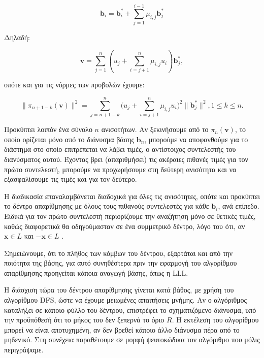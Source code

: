 $$ \bm b_i = \bm b_i^* + \sum_{j=1}^{i-1} μ_{i,j} \bm b_j^* $$

Δηλαδή:

$$ \bm v = \sum_{j=1}^n(u_j + \sum_{i=j+1}^n μ_{i,j} u_i) \bm b_j^*, $$

οπότε και για τις νόρμες των προβολών έχουμε:

\begin{equation}
    \| \pi_{n+1-k}(\bm v) \|^2 = \sum_{j=n+1-k}^n  \bigg( u_j + \sum_{i=j+1}^n μ_{i,j} u_i  \bigg) ^2 \| \bm b_j^* \|^2, 1 \leq k \leq n. 
\end{equation}

Προκύπτει λοιπόν ένα σύνολο $ n $ ανισοτήτων. Αν ξεκινήσουμε από το $ \pi_n( \bm v)$, το οποίο ορίζεται μόνο από το διάνυσμα βάσης $\bm b_n $, μπορούμε να αποφανθούμε για το διάστημα στο οποίο επιτρέπεται να λάβει τιμές, ο αντίστοιχος συντελεστής του διανύσματος αυτού. Έχοντας βρει (απαριθμήσει) τις ακέραιες πιθανές τιμές για τον πρώτο συντελεστή, μπορούμε να προχωρήσουμε στη δεύτερη ανισότητα και να εξασφαλίσουμε τις τιμές και για τον δεύτερο.

Η διαδικασία επαναλαμβάνεται διαδοχικά για όλες τις ανισότητες, οπότε και προκύπτει το δέντρο απαρίθμησης με όλους τους πιθανούς συντελεστές για κάθε $\bm b_i $, ανά επίπεδο. Ειδικά για τον πρώτο συντελεστή περιορίζουμε την αναζήτηση μόνο σε θετικές τιμές, καθώς διαφορετικά θα οδηγούμασταν σε ένα συμμετρικό δέντρο, λόγο του ότι, αν $ \bm x \in L $ και $ - \bm x \in L $ .

Σημειώνουμε, ότι το πλήθος των κόμβων του δέντρου, εξαρτάται και από την ποιότητα της βάσης, για αυτό συνηθέστερα πριν την εφαρμογή του αλγορίθμου απαρίθμησης προηγείται κάποια αναγωγή βάσης, όπως η LLL.  

Η διάσχιση τώρα του δέντρου απαρίθμησης γίνεται κατά βάθος, με χρήση του αλγορίθμου DFS, ώστε να έχουμε μειωμένες απαιτήσεις μνήμης. Αν ο αλγόριθμος καταλήξει σε κάποιο φύλλο του δέντρου, επιστρέφει το σχηματιζόμενο διάνυσμα, υπό την προϋπόθεσή ότι το μήκος του δεν ξεπερνά το όριο $R$. Η εκτέλεση του αλγορίθμου μπορεί να είναι αποτυχημένη, αν δεν βρεθεί κάποιο άλλο διάνυσμα πέρα από το μηδενικό. Στη συνέχεια παραθέτουμε σε μορφή ψευτοκώδικα τον αλγόριθμο που μόλις περιγράψαμε.   


